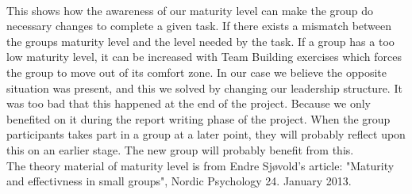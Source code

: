 \\
This shows how the awareness of our maturity level can make the group do necessary changes to complete a given task. If there exists a mismatch between the groups maturity level and the level needed by the task. If a group has a too low maturity level, it can be increased with Team Building exercises which forces the group to move out of its comfort zone. In our case we believe the opposite situation was present, and this we solved by changing our leadership structure. It was too bad that this happened at the end of the project. Because we only benefited on it during the report writing phase of the project. When the group participants takes part in a group at a later point, they will probably reflect upon this on an earlier stage. The new group will probably benefit from this.      
\\
The theory material of maturity level is from Endre Sjøvold's article: "Maturity and effectivness in small groups", Nordic Psychology 24. January 2013.  